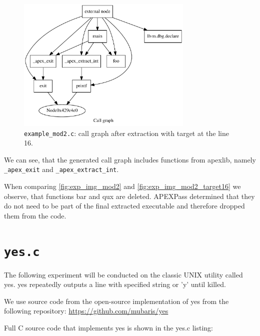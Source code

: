 \documentclass[12pt, twoside]{fithesis2}
\renewcommand{\_}{\leavevmode \kern0.07em\vbox{\hrule width0.4em}}
\begin{document}
\begin{figure}[ht]
    \centering
    \includegraphics[width=0.75\textwidth]{images/experiments/mod2_target16.pdf}
    \caption{
    \texttt{example_mod2.c}: call graph after extraction with target
    at the line 16.
    }
    \label{fig:exp_img_mod2_target16}
\end{figure}

We can see, that the generated call graph includes functions
from apexlib, namely \texttt{_apex_exit} and
\texttt{_apex_extract_int}.

When comparing \autoref{fig:exp_img_mod2} and
\autoref{fig:exp_img_mod2_target16} we observe, that functions bar and qux are
deleted. APEXPass determined that they do not need to be part of the final
extracted executable and therefore dropped them from the code.



\section{\texttt{yes.c}}
\label{sec:exp_yes}

The following experiment will be conducted on the classic UNIX utility called
yes.
yes repeatedly outputs a line with specified string or 'y' until
killed.

We use source code from the open-source implementation of yes
from the following repository: \url{https://github.com/mubaris/yes}

Full C source code that implements yes is shown in the yes.c listing:
\end{document}
